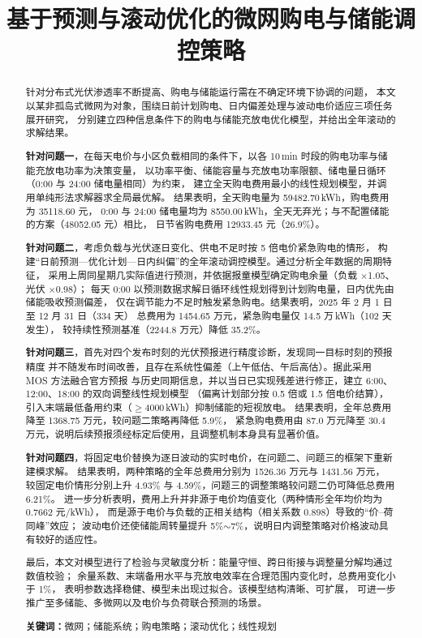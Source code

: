 \documentclass{cumcmthesis}
\title{基于预测与滚动优化的微网购电与储能调控策略}
\begin{document}
 \maketitle  %
 \begin{abstract}
针对分布式光伏渗透率不断提高、购电与储能运行需在不确定环境下协调的问题，
本文以某非孤岛式微网为对象，围绕日前计划购电、日内偏差处理与波动电价适应三项任务展开研究，
分别建立四种信息条件下的购电与储能充放电优化模型，并给出全年滚动的求解结果。

\textbf{针对问题一}，在每天电价与小区负载相同的条件下，以各 10\,min 时段的购电功率与储能充放电功率为决策变量，
以功率平衡、储能容量与充放电功率限额、储电量日循环（0:00 与 24:00 储电量相同）为约束，
建立全天购电费用最小的线性规划模型，并调用单纯形法求解器求全局最优解。
结果表明，全天购电量为 59482.70\,kWh，购电费用为 35118.60 元，
0:00 与 24:00 储电量均为 8550.00\,kWh，全天无弃光；与不配置储能的方案（48052.05 元）相比，
日节省购电费用 12933.45 元（26.9\%）。

\textbf{针对问题二}，考虑负载与光伏逐日变化、供电不足时按 5 倍电价紧急购电的情形，
构建“日前预测—优化计划—日内纠偏”的全年滚动调控模型。通过分析全年数据的周期特征，
采用上周同星期几实际值进行预测，并依据报童模型确定购电余量（负载 $\times$1.05、光伏 $\times$0.98）；
每天 0:00 以预测数据求解日循环线性规划得到计划购电量，日内优先由储能吸收预测偏差，
仅在调节能力不足时触发紧急购电。结果表明，2025 年 2 月 1 日至 12 月 31 日（334 天）
总费用为 1454.65 万元，紧急购电量仅 14.5 万\,kWh（102 天发生），
较持续性预测基准（2244.8 万元）降低 35.2\%。

\textbf{针对问题三}，首先对四个发布时刻的光伏预报进行精度诊断，发现同一目标时刻的预报精度
并不随发布时间改善，且存在系统性偏差（上午低估、午后高估）。据此采用 MOS 方法融合官方预报
与历史同期信息，并以当日已实现残差进行修正，建立 6:00、12:00、18:00 的双向调整线性规划模型
（偏离计划部分按 0.5 倍或 1.5 倍电价结算），引入末端最低备用约束（$\ge$4000\,kWh）抑制储能的短视放电。
结果表明，全年总费用降至 1368.75 万元，较问题二策略再降低 5.9\%，
紧急购电费用由 87.0 万元降至 30.4 万元，说明后续预报须经标定后使用，且调整机制本身具有显著价值。

\textbf{针对问题四}，将固定电价替换为逐日波动的实时电价，在问题二、问题三的框架下重新建模求解。
结果表明，两种策略的全年总费用分别为 1526.36 万元与 1431.56 万元，
较固定电价情形分别上升 4.93\% 与 4.59\%，问题三的调整策略较问题二仍可降低总费用 6.21\%。
进一步分析表明，费用上升并非源于电价均值变化（两种情形全年均价均为 0.7662 元/kWh），
而是源于电价与负载的正相关结构（相关系数 0.898）导致的“价--荷同峰”效应；
波动电价还使储能周转量提升 5\%$\sim$7\%，说明日内调整策略对价格波动具有较好的适应性。

最后，本文对模型进行了检验与灵敏度分析：能量守恒、跨日衔接与调整量分解均通过数值校验；
余量系数、末端备用水平与充放电效率在合理范围内变化时，总费用变化小于 1\%，
表明参数选择稳健、模型未出现过拟合。该模型结构清晰、可扩展，
可进一步推广至多储能、多微网以及电价与负荷联合预测的场景。

\textbf{关键词：}微网；储能系统；购电策略；滚动优化；线性规划

\end{abstract}
\end{document}
